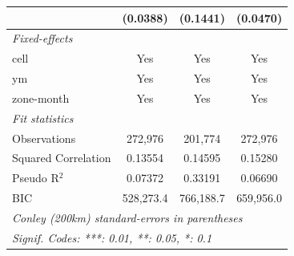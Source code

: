\begin{tabular}{lccc}
                                           & (0.0388)       & (0.1441)       & (0.0470)\\   
   \midrule
   \emph{Fixed-effects}\\
   cell                                    & Yes            & Yes            & Yes\\  
   ym                                      & Yes            & Yes            & Yes\\  
   zone-month                              & Yes            & Yes            & Yes\\  
   \midrule
   \emph{Fit statistics}\\
   Observations                            & 272,976        & 201,774        & 272,976\\  
   Squared Correlation                     & 0.13554        & 0.14595        & 0.15280\\  
   Pseudo R$^2$                            & 0.07372        & 0.33191        & 0.06690\\  
   BIC                                     & 528,273.4      & 766,188.7      & 659,956.0\\  
   \midrule \midrule
   \multicolumn{4}{l}{\emph{Conley (200km) standard-errors in parentheses}}\\
   \multicolumn{4}{l}{\emph{Signif. Codes: ***: 0.01, **: 0.05, *: 0.1}}\\
\end{tabular}
\par\endgroup


